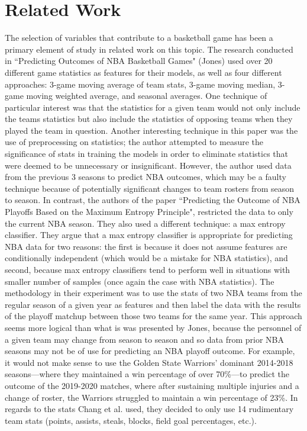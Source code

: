 \documentclass[letterpaper]{article} %
\begin{document}

\section{Related Work}

The selection of variables that contribute to a basketball game has been a primary element of study in related work on this topic. The research conducted in ``Predicting Outcomes of NBA Basketball Games" (Jones) used over 20 different game statistics as features for their models, as well as four different approaches: 3-game moving average of team stats, 3-game moving median, 3-game moving weighted average, and seasonal averages. One technique of particular interest was that the statistics for a given team would not only include the teams statistics but also include the statistics of opposing teams when they played the team in question. Another interesting technique in this paper was the use of preprocessing on statistics; the author attempted to measure the significance of stats in training the models in order to eliminate statistics that were deemed to be unnecessary or insignificant. However, the author used data from the previous 3 seasons to predict NBA outcomes, which may be a faulty technique because of potentially significant changes to team rosters from season to season. In contrast, 
the authors \cite{predicting_maximum_entropy} of the paper ``Predicting the Outcome of NBA Playoffs Based on the Maximum Entropy Principle", restricted the data to only the current NBA season. They also used a different technique: a max entropy classifier. They argue that a max entropy classifier is appropriate for predicting NBA data for two reasons: the first is because it does not assume features are conditionally independent (which would be a mistake for NBA statistics), and second, because max entropy classifiers tend to perform well in situations with smaller number of samples (once again the case with NBA statistics). The methodology in their experiment was to use the stats of two NBA teams from the regular season of a given year  as features and then label the data with the results of the playoff matchup between those two teams for the same year. This approach seems more logical than what is was presented by Jones, because the personnel of a given team may change from season to season and so data from prior NBA seasons may not be of use for predicting an NBA playoff outcome. For example, it would not make sense to use the Golden State Warriors' dominant 2014-2018 seasons---where they maintained a win percentage of over 70\%---to predict the outcome of the 2019-2020 matches, where after sustaining multiple injuries and a change of roster, the Warriors struggled to maintain a win percentage of 23\%. In regards to the stats Chang et al. used, they decided to only use 14 rudimentary team stats (points, assists, steals, blocks, field goal percentages, etc.).
\end{document}
